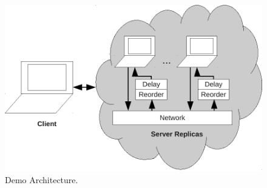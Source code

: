 \begin{figure}[t]
\centering
\includegraphics[width=0.9\linewidth]{fig/demoarch.pdf}
\caption{Demo Architecture.}
\label{fig:demoarch}
\end{figure}

